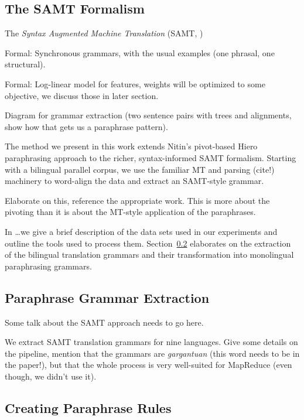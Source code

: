 \documentclass[11pt]{article}
\begin{document}
\subsection{The SAMT Formalism}

The \emph{Syntax Augmented Machine Translation} (SAMT,
\cite{Zollmann2006})

Formal: Synchronous grammars, with the usual examples (one phrasal, one
structural).

Formal: Log-linear model for features, weights will be optimized to some
objective, we discuss those in later section.

Diagram for grammar extraction (two sentence pairs with trees and
alignments, show how that gets us a paraphrase pattern). 



The method we present in this work extends Nitin's pivot-based Hiero
paraphrasing approach to the richer, syntax-informed SAMT
formalism. Starting with a bilingual parallel corpus, we use the
familiar MT and parsing (cite!) machinery to word-align the data and
extract an SAMT-style grammar.

Elaborate on this, reference the appropriate work. This is more about
the pivoting than it is about the MT-style application of the
paraphrases.

In \ldots we give a brief description of the
data sets used in our experiments and outline the tools used to
process them. Section~\ref{extraction} elaborates on the extraction
of the bilingual translation grammars and their transformation into
monolingual paraphrasing grammars.

\subsection{Paraphrase Grammar Extraction} \label{extraction}

Some talk about the SAMT approach needs to go here. 

We extract SAMT translation grammars for nine languages. Give some
details on the pipeline, mention that the grammars are
\emph{gargantuan} (this word needs to be in the paper!), but that the
whole process is very well-suited for MapReduce (even though, we
didn't use it).

\subsection{Creating Paraphrase Rules} \label{rule_creation}
\end{document}
